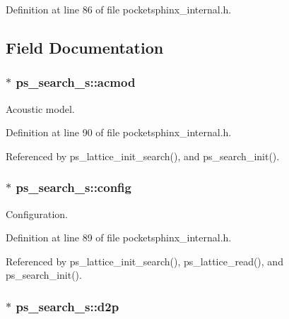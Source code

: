 Definition at line 86 of file pocketsphinx\-\_\-internal.\-h.



\subsection{Field Documentation}
\subsubsection[{acmod}]{$\ast$ ps\-\_\-search\-\_\-s\-::acmod}\label{structps__search__s_a0fdf6fe8c4d9c28f10c48c09517c6b91}


Acoustic model. 



Definition at line 90 of file pocketsphinx\-\_\-internal.\-h.



Referenced by ps\-\_\-lattice\-\_\-init\-\_\-search(), and ps\-\_\-search\-\_\-init().

\subsubsection[{config}]{$\ast$ ps\-\_\-search\-\_\-s\-::config}\label{structps__search__s_aa6e3e18165bbc70084a06575d5703042}


Configuration. 



Definition at line 89 of file pocketsphinx\-\_\-internal.\-h.



Referenced by ps\-\_\-lattice\-\_\-init\-\_\-search(), ps\-\_\-lattice\-\_\-read(), and ps\-\_\-search\-\_\-init().

\subsubsection[{d2p}]{$\ast$ ps\-\_\-search\-\_\-s\-::d2p}\label{structps__search__s_a81b461e7ef3a080d046039e186134a15}


